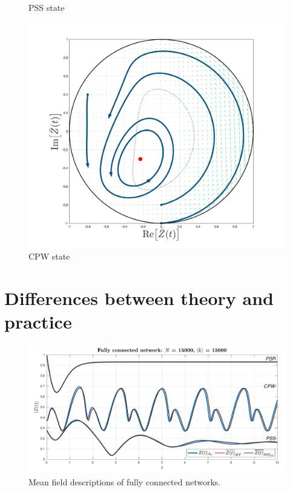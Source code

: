 \begin{figure}[H]
  \caption{PSS state}\label{fig:MFRPSS}
\endminipage\hfill
{}%
  \includegraphics[width=\linewidth, trim={2cm 1cm 2cm 1.5cm },clip]{../Figures/MFOARCPW_scalefree.png}
  \caption{CPW state}\label{fig:MFRCPW}
\endminipage
\end{figure}


\section{Differences between theory and practice}
\begin{figure}[H]
  \includegraphics[width=\linewidth]{../Figures/InspectMeanFieldFullyConnected.pdf}
  \caption{Mean field descriptions of fully connected networks.}\label{fig:InspectMeanFieldFullyConnected}
\end{figure}

